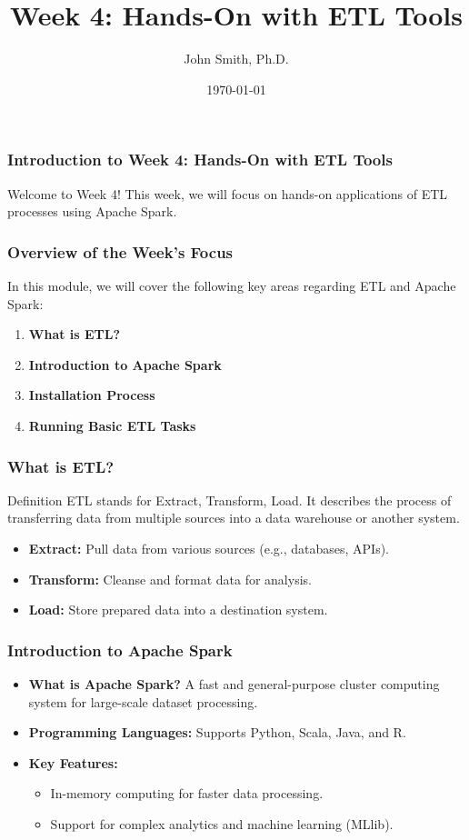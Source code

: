 \documentclass[aspectratio=169]{beamer}
\title[Week 4: Hands-On with ETL Tools]{Week 4: Hands-On with ETL Tools}
\author[J. Smith]{John Smith, Ph.D.}
\institute[University Name]{
  Department of Computer Science\\
  University Name\\
  \vspace{0.3cm}
  Email: email@university.edu\\
  Website: www.university.edu
}
\date{\today}
\begin{document}
\frame{\titlepage}

\begin{frame}[fragile]
    \frametitle{Introduction to Week 4: Hands-On with ETL Tools}
    Welcome to Week 4! This week, we will focus on hands-on applications of ETL processes using Apache Spark.
\end{frame}

\begin{frame}[fragile]
    \frametitle{Overview of the Week's Focus}
    In this module, we will cover the following key areas regarding ETL and Apache Spark:
    \begin{enumerate}
        \item \textbf{What is ETL?}
        \item \textbf{Introduction to Apache Spark}
        \item \textbf{Installation Process}
        \item \textbf{Running Basic ETL Tasks}
    \end{enumerate}
\end{frame}

\begin{frame}[fragile]
    \frametitle{What is ETL?}
    \begin{block}{Definition}
        ETL stands for Extract, Transform, Load. It describes the process of transferring data from multiple sources into a data warehouse or another system.
    \end{block}
    \begin{itemize}
        \item \textbf{Extract:} Pull data from various sources (e.g., databases, APIs).
        \item \textbf{Transform:} Cleanse and format data for analysis.
        \item \textbf{Load:} Store prepared data into a destination system.
    \end{itemize}
\end{frame}

\begin{frame}[fragile]
    \frametitle{Introduction to Apache Spark}
    \begin{itemize}
        \item \textbf{What is Apache Spark?} A fast and general-purpose cluster computing system for large-scale dataset processing.
        \item \textbf{Programming Languages:} Supports Python, Scala, Java, and R.
        \item \textbf{Key Features:}
            \begin{itemize}
                \item In-memory computing for faster data processing.
                \item Support for complex analytics and machine learning (MLlib).
            \end{itemize}
    \end{itemize}
\end{frame}
\end{document}
